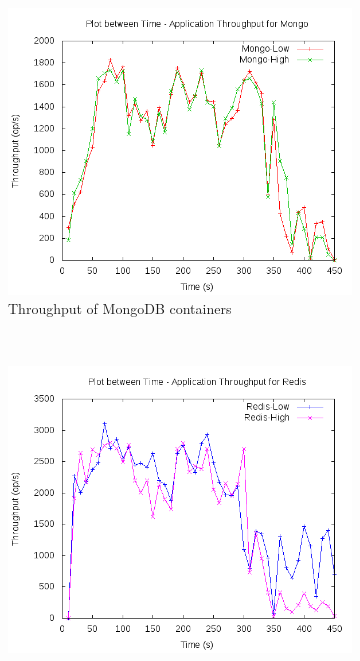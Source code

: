 	\begin{figure}[t!]
	  \centering
	  \begin{subfigure}[t]{0.48\textwidth}
	    \centering
	    \includegraphics[width=1\textwidth]{images/inference/below_sl_mongo.png}
	    \caption{Throughput of MongoDB containers}
	    \label{plot_inference_below_sl_mongo}
	  \end{subfigure}
	  ~ 
	  \begin{subfigure}[t]{0.48\textwidth}
	    \centering
	    \includegraphics[width=1\textwidth]{images/inference/below_sl_redis.png}

\end{subfigure}
\end{figure}
